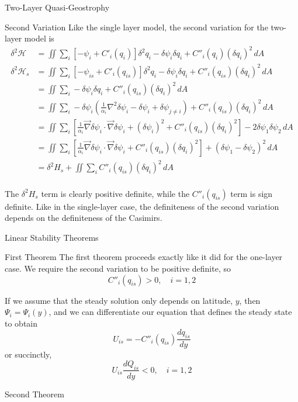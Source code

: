 \documentclass[12pt]{article}
\begin{document}
\begin{section}{Two-Layer Quasi-Geostrophy}
    \begin{subsection}{Second Variation}
        Like the single layer model, the second variation for the two-layer model is
        \begin{align*}
            \delta^2 \mathcal{H} &= \iint \sum_i \left[ - \psi_i + C'_i(q_i) \right]  \delta^2 q_i  - \delta \psi_i \delta q_i +  C''_i(q_i) (\delta q_i)^2  \, dA \\
            \delta^2 \mathcal{H}_s &= \iint \sum_i \left[ - \psi_{is} + C'_i(q_{is}) \right]  \delta^2 q_i  - \delta \psi_i \delta q_i +  C''_i(q_{is}) (\delta q_i)^2  \, dA \\
            &= \iint \sum_i - \delta \psi_i \delta q_i +  C''_i(q_{is}) (\delta q_i)^2  \, dA \\
            &= \iint \sum_i - \delta \psi_i \left( \frac{1}{\alpha_i} \nabla^2 \delta \psi_i - \delta\psi_i + \delta\psi_{j \ne i} \right) +  C''_i(q_{is}) (\delta q_i)^2  \, dA \\
            &= \iint \sum_i \left[ \frac{1}{\alpha_i} \vec\nabla\delta\psi_i \cdot \vec\nabla\delta\psi_i + (\delta\psi_i)^2 + C''_i(q_{is}) (\delta q_i)^2 \right]  - 2\delta\psi_1\delta\psi_2 \, dA \\
            &= \iint \sum_i \left[ \frac{1}{\alpha_i} \vec\nabla\delta\psi_i \cdot \vec\nabla\delta\psi_i + C''_i(q_{is}) (\delta q_i)^2 \right]+ (\delta\psi_1 - \delta\psi_2)^2 \, dA \\
            &= \delta^2 H_s + \iint \sum_i C''_i(q_{is})(\delta q_i)^2 \, dA \\
        \end{align*}

        The $\delta^2 H_s$ term is clearly positive definite, while the $C''_i(q_{is})$ term is sign definite. Like in the single-layer case, the definiteness of the second variation depends on the definiteness of the Casimirs.
    \end{subsection}

    \begin{subsection}{Linear Stability Theorems}
        \begin{subsubsection}{First Theorem}
            The first theorem proceeds exactly like it did for the one-layer case. We require the second variation to be positive definite, so
            $$
            C''_i(q_{is}) > 0, \quad i=1,2
            $$

            If we assume that the steady solution only depends on latitude, $y$, then $\Psi_i = \Psi_i(y)$, and we can differentiate our equation that defines the steady state to obtain
            $$
            U_{is} = -C''_i(q_{is}) \frac{dq_{is}}{dy}
            $$
            or succinctly,
            $$
            U_{is} \frac{d Q_{is}}{dy} < 0, \quad i=1,2
            $$
        \end{subsubsection}
        \begin{subsubsection}{Second Theorem}
        \end{subsubsection}
    \end{subsection}


\end{section}
\end{document}
